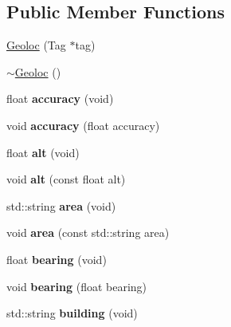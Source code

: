\subsection*{Public Member Functions}
\begin{DoxyCompactItemize}
\item 
\hyperlink{classGeoloc_aa824ebc47c66afb31e9332af9b4c44eb}{Geoloc} (Tag $\ast$tag)
\item 
\hyperlink{classGeoloc_a9ca243f538febd3ebed8e536b3f09c5f}{$\sim$Geoloc} ()
\item 
\hypertarget{classGeoloc_a702ce2bba31e411d418ee4001da7b386}{
float {\bfseries accuracy} (void)}
\label{classGeoloc_a702ce2bba31e411d418ee4001da7b386}

\item 
\hypertarget{classGeoloc_a8bb5e71eb6d97cdb5b23b39fbf450534}{
void {\bfseries accuracy} (float accuracy)}
\label{classGeoloc_a8bb5e71eb6d97cdb5b23b39fbf450534}

\item 
\hypertarget{classGeoloc_ae584a8420c5ff704cf6aa066431babdc}{
float {\bfseries alt} (void)}
\label{classGeoloc_ae584a8420c5ff704cf6aa066431babdc}

\item 
\hypertarget{classGeoloc_a6f4e1b6645e52b20fe1bb3683d061d8e}{
void {\bfseries alt} (const float alt)}
\label{classGeoloc_a6f4e1b6645e52b20fe1bb3683d061d8e}

\item 
\hypertarget{classGeoloc_ab21a3cfb386e8b4e51148ccb6a1b91ea}{
std::string {\bfseries area} (void)}
\label{classGeoloc_ab21a3cfb386e8b4e51148ccb6a1b91ea}

\item 
\hypertarget{classGeoloc_a3f4c14c334e56139bd17fe6b9957b90b}{
void {\bfseries area} (const std::string area)}
\label{classGeoloc_a3f4c14c334e56139bd17fe6b9957b90b}

\item 
\hypertarget{classGeoloc_a3fdac6be13bc72a90d36df914b2b2d10}{
float {\bfseries bearing} (void)}
\label{classGeoloc_a3fdac6be13bc72a90d36df914b2b2d10}

\item 
\hypertarget{classGeoloc_a99a6d22c2d2e7d966a3571110095c5ca}{
void {\bfseries bearing} (float bearing)}
\label{classGeoloc_a99a6d22c2d2e7d966a3571110095c5ca}

\item 
\hypertarget{classGeoloc_a281f2d8534aa3f1dca69d0a88768fa42}{
std::string {\bfseries building} (void)}
\label{classGeoloc_a281f2d8534aa3f1dca69d0a88768fa42}


\end{DoxyCompactItemize}
